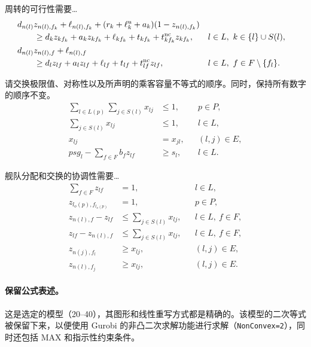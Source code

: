 \documentclass{article}
\begin{document}
周转的可行性需要…
\begin{align}
 &d_{n(l)}z_{n(l),f_k}+\ell_{n(l),f_k}
 +(r_k+\ell_k^u+a_k)(1-z_{n(l),f_k})\notag\\
 &\qquad\geq d_kz_{k f_k}+a_kz_{k f_k}
 +\ell_{k f_k}+t_{k f_k}+t_{k f_k}^{\mathrm{nc}}z_{k f_k},
 &&l\in L,\ k\in\{l\}\cup S(l),\\
 &d_{n(l)}z_{n(l),f}+\ell_{n(l),f}\notag\\
 &\qquad\geq d_lz_{lf}+a_lz_{lf}
 +\ell_{lf}+t_{lf}+t_{lf}^{\mathrm{nc}}z_{lf},
 &&l\in L,\ f\in F\setminus\{f_l\}.
\end{align}

请交换极限值、对称性以及所声明的乘客容量不等式的顺序。同时，保持所有数字的顺序不变。
\begin{align}
 \sum_{l\in L(p)}\sum_{j\in S(l)}x_{lj}&\leq1, &&p\in P,\\
 \sum_{j\in S(l)}x_{lj}&\leq1, &&l\in L,\\
 x_{lj}&=x_{jl}, &&(l,j)\in E,\\
 psg_l-\sum_{f\in F}b_fz_{lf}&\geq s_l, &&l\in L.
\end{align}

舰队分配和交换的协调性需要…
\begin{align}
 \sum_{f\in F}z_{lf}&=1, &&l\in L,\\
 z_{l_o(p),f_{l_o(p)}}&=1, &&p\in P,\\
 z_{n(l),f}-z_{lf}&\leq\sum_{j\in S(l)}x_{lj}, &&l\in L,\ f\in F,\\
 z_{lf}-z_{n(l),f}&\leq\sum_{j\in S(l)}x_{lj}, &&l\in L,\ f\in F,\\
 z_{n(j),f_l}&\geq x_{lj}, &&(l,j)\in E,\\
 z_{n(l),f_j}&\geq x_{lj}, &&(l,j)\in E.
\end{align}

\paragraph{保留公式表述。}
这是选定的模型（20–40），其图形和线性重写方式都是精确的。该模型的二次等式被保留下来，以便使用 Gurobi 的非凸二次求解功能进行求解（\texttt{NonConvex=2}），同时还包括 MAX 和指示性约束条件。
\end{document}
